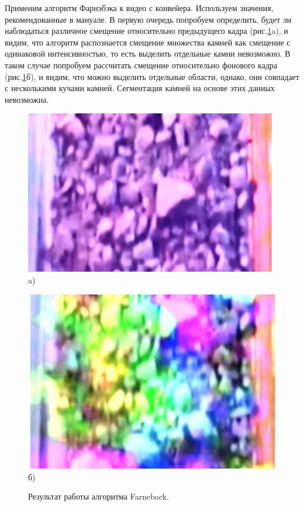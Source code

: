 \documentclass[times]{itmo-student-thesis}
\begin{document}
Применим алгоритм Фарнэбэка к видео с конвейера. Используем значения, рекомендованные в мануале. В первую очередь попробуем определить, будет ли наблюдаться различное смещение относительно предыдущего кадра (рис.\ref{fig:farn}a), и видим, что алгоритм распознается смещение множества камней как смещение с одинаковой интенсивностью, то есть выделить отдельные камни невозможно. В таком случае попробуем рассчитать смещение относительно фонового кадра (рис.\ref{fig:farn}б), и видим, что можно выделить отдельные области, однако, они совпадает с несколькими кучами камней. Сегментация камней на основе этих данных невозможна.

\begin{figure}[h]
	\begin{minipage}[h]{0.49\linewidth}
		\centering
		\includegraphics[width=0.9\linewidth]{images/pink} \\ a)
	\end{minipage}
	\hfill
	\begin{minipage}[h]{0.49\linewidth}
		\centering
		\includegraphics[width=0.9\linewidth]{images/color} \\ б)
	\end{minipage}
	\caption{Результат работы алгоритма Farneback. }
	\label{fig:farn}
\end{figure}
\end{document}
